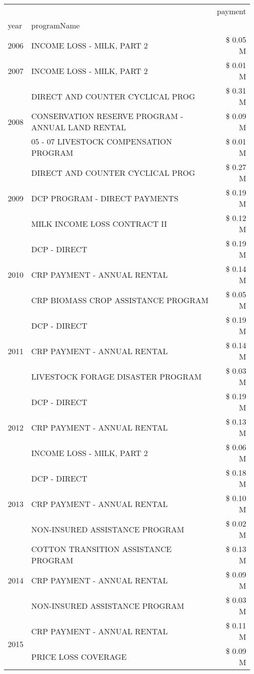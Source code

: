 \begin{tabular}{llr}
\toprule
 &  & payment \\
year & programName &  \\
\midrule
2006 & INCOME LOSS - MILK, PART 2 & \$ 0.05 M \\
\cline{1-3}
2007 & INCOME LOSS - MILK, PART 2 & \$ 0.01 M \\
\cline{1-3}
\multirow[t]{3}{*}{2008} & DIRECT AND COUNTER CYCLICAL PROG & \$ 0.31 M \\
 & CONSERVATION RESERVE PROGRAM - ANNUAL LAND RENTAL & \$ 0.09 M \\
 & 05 - 07 LIVESTOCK COMPENSATION PROGRAM & \$ 0.01 M \\
\cline{1-3}
\multirow[t]{3}{*}{2009} & DIRECT AND COUNTER CYCLICAL PROG & \$ 0.27 M \\
 & DCP PROGRAM - DIRECT PAYMENTS & \$ 0.19 M \\
 & MILK INCOME LOSS CONTRACT II & \$ 0.12 M \\
\cline{1-3}
\multirow[t]{3}{*}{2010} & DCP - DIRECT & \$ 0.19 M \\
 & CRP PAYMENT - ANNUAL RENTAL & \$ 0.14 M \\
 & CRP BIOMASS CROP ASSISTANCE PROGRAM & \$ 0.05 M \\
\cline{1-3}
\multirow[t]{3}{*}{2011} & DCP - DIRECT & \$ 0.19 M \\
 & CRP PAYMENT - ANNUAL RENTAL & \$ 0.14 M \\
 & LIVESTOCK FORAGE DISASTER PROGRAM & \$ 0.03 M \\
\cline{1-3}
\multirow[t]{3}{*}{2012} & DCP - DIRECT & \$ 0.19 M \\
 & CRP PAYMENT - ANNUAL RENTAL & \$ 0.13 M \\
 & INCOME LOSS - MILK, PART 2 & \$ 0.06 M \\
\cline{1-3}
\multirow[t]{3}{*}{2013} & DCP - DIRECT & \$ 0.18 M \\
 & CRP PAYMENT - ANNUAL RENTAL & \$ 0.10 M \\
 & NON-INSURED ASSISTANCE PROGRAM & \$ 0.02 M \\
\cline{1-3}
\multirow[t]{3}{*}{2014} & COTTON TRANSITION ASSISTANCE PROGRAM & \$ 0.13 M \\
 & CRP PAYMENT - ANNUAL RENTAL & \$ 0.09 M \\
 & NON-INSURED ASSISTANCE PROGRAM & \$ 0.03 M \\
\cline{1-3}
\multirow[t]{3}{*}{2015} & CRP PAYMENT - ANNUAL RENTAL & \$ 0.11 M \\
 & PRICE LOSS COVERAGE & \$ 0.09 M \\

\end{tabular}
